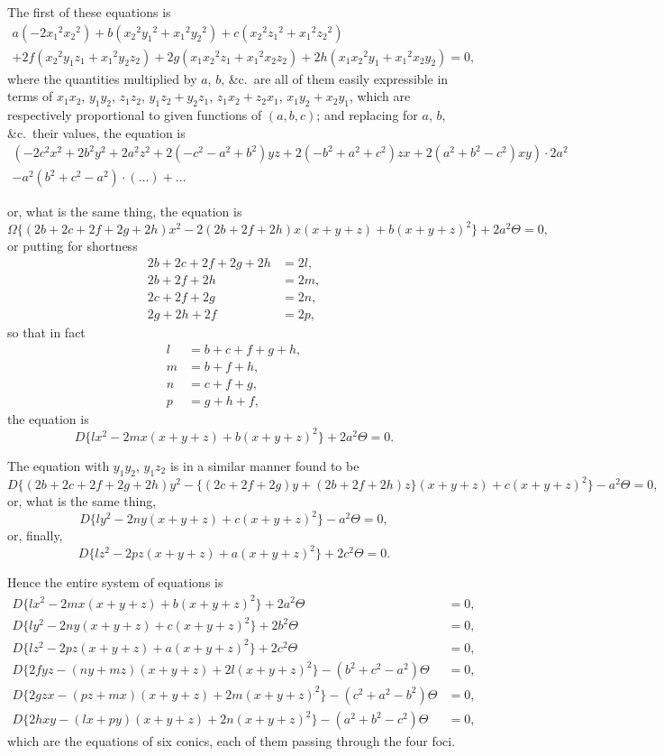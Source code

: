 \documentclass[11pt,a4paper]{book}
\begin{document}
The first of these equations is
\begin{multline*}
a(-2x_1{}^2x_2{}^2) + b(x_2{}^2y_1{}^2 + x_1{}^2y_2{}^2) + c(x_2{}^2z_1{}^2 + x_1{}^2z_2{}^2)\\
+ 2f(x_2{}^2y_1z_1 + x_1{}^2y_2z_2) + 2g(x_1x_2{}^2z_1 + x_1{}^2x_2z_2) + 2h(x_1x_2{}^2y_1 + x_1{}^2x_2y_2) = 0,
\end{multline*}
where the quantities multiplied by $a$, $b$, \&c.\ are all of them easily expressible in terms of $x_1x_2$, $y_1y_2$, $z_1z_2$, $y_1z_2 + y_2z_1$, $z_1x_2 + z_2x_1$, $x_1y_2 + x_2y_1$, which are respectively proportional to given functions of $(a, b, c)$; and replacing for $a$, $b$, \&c.\ their values, the equation is
\begin{multline*}
(-2c^2x^2 + 2b^2y^2 + 2a^2z^2 + 2(-c^2-a^2+b^2)yz + 2(-b^2+a^2+c^2)zx + 2(a^2+b^2-c^2)xy) \cdot 2a^2\\
- a^2(b^2+c^2-a^2)\cdot(\ldots) + \ldots
\end{multline*}

\newpage
\setcounter{page}{508}

or, what is the same thing, the equation is
\[
\Omega\{(2b + 2c + 2f + 2g + 2h)x^2 - 2(2b + 2f + 2h)x(x+y+z) + b(x+y+z)^2\} + 2a^2\Theta = 0,
\]
or putting for shortness
\begin{align*}
2b + 2c + 2f + 2g + 2h &= 2l,\\
2b + 2f + 2h &= 2m,\\
2c + 2f + 2g &= 2n,\\
2g + 2h + 2f &= 2p,
\end{align*}
so that in fact
\begin{align*}
l &= b+c+f+g+h,\\
m &= b+f+h,\\
n &= c+f+g,\\
p &= g+h+f,
\end{align*}
the equation is
\[
D\{lx^2 - 2mx(x+y+z) + b(x+y+z)^2\} + 2a^2\Theta = 0.
\]

The equation with $y_1y_2$, $y_1z_2$ is in a similar manner found to be
\[
D\{(2b+2c+2f+2g+2h)y^2 - \{(2c+2f+2g)y + (2b+2f+2h)z\}(x+y+z) + c(x+y+z)^2\} - a^2\Theta = 0,
\]
or, what is the same thing,
\[
D\{ly^2 - 2ny(x+y+z) + c(x+y+z)^2\} - a^2\Theta = 0,
\]
or, finally,
\[
D\{lz^2 - 2pz(x+y+z) + a(x+y+z)^2\} + 2c^2\Theta = 0.
\]

Hence the entire system of equations is
\begin{align*}
D\{lx^2 - 2mx(x+y+z) + b(x+y+z)^2\} + 2a^2\Theta &= 0,\\
D\{ly^2 - 2ny(x+y+z) + c(x+y+z)^2\} + 2b^2\Theta &= 0,\\
D\{lz^2 - 2pz(x+y+z) + a(x+y+z)^2\} + 2c^2\Theta &= 0,\\
D\{2fyz - (ny + mz)(x+y+z) + 2l(x+y+z)^2\} - (b^2+c^2-a^2)\Theta &= 0,\\
D\{2gzx - (pz + mx)(x+y+z) + 2m(x+y+z)^2\} - (c^2+a^2-b^2)\Theta &= 0,\\
D\{2hxy - (lx + py)(x+y+z) + 2n(x+y+z)^2\} - (a^2+b^2-c^2)\Theta &= 0,
\end{align*}
which are the equations of six conics, each of them passing through the four foci.
\end{document}
